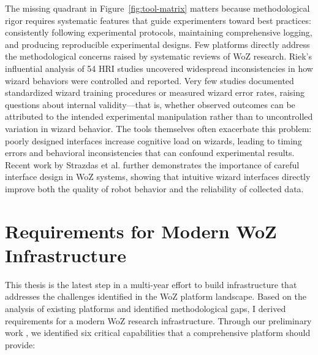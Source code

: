 The missing quadrant in Figure~\ref{fig:tool-matrix} matters because methodological rigor requires systematic features that guide experimenters toward best practices: consistently following experimental protocols, maintaining comprehensive logging, and producing reproducible experimental designs. Few platforms directly address the methodological concerns raised by systematic reviews of WoZ research. Riek's influential analysis \cite{Riek2012} of 54 HRI studies uncovered widespread inconsistencies in how wizard behaviors were controlled and reported. Very few studies documented standardized wizard training procedures or measured wizard error rates, raising questions about internal validity---that is, whether observed outcomes can be attributed to the intended experimental manipulation rather than to uncontrolled variation in wizard behavior. The tools themselves often exacerbate this problem: poorly designed interfaces increase cognitive load on wizards, leading to timing errors and behavioral inconsistencies that can confound experimental results. Recent work by Strazdas et al. \cite{Strazdas2020} further demonstrates the importance of careful interface design in WoZ systems, showing that intuitive wizard interfaces directly improve both the quality of robot behavior and the reliability of collected data.

\section{Requirements for Modern WoZ Infrastructure}

This thesis is the latest step in a multi-year effort to build infrastructure that addresses the challenges identified in the WoZ platform landscape. Based on the analysis of existing platforms and identified methodological gaps, I derived requirements for a modern WoZ research infrastructure. Through our preliminary work \cite{OConnor2024}, we identified six critical capabilities that a comprehensive platform should provide:

